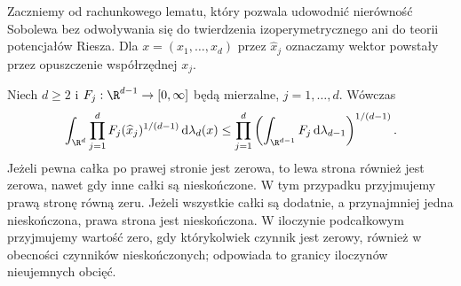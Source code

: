 Zaczniemy od rachunkowego lematu, który pozwala udowodnić
nierówność Sobolewa bez odwoływania się do twierdzenia
izoperymetrycznego ani do teorii potencjałów Riesza.
Dla $x=(x_1,\ldots,x_d)$ przez $\widehat x_j$ oznaczamy
wektor powstały przez opuszczenie współrzędnej $x_j$.

\begin{lemat}
\label{lem:pde10-LW}
Niech $d\ge2$ i $F_j:\R^{d-1}\to[0,\infty]$ będą mierzalne,
$j=1,\ldots,d$. Wówczas
\[
 \int_{\R^d}\prod_{j=1}^d F_j(\widehat x_j)^{1/(d-1)}
 \,\mathrm d\lambda_d(x)
 \le \prod_{j=1}^d
 \left(\int_{\R^{d-1}}F_j\,\mathrm d\lambda_{d-1}\right)^{1/(d-1)}.
\]
Jeżeli pewna całka po prawej stronie jest zerowa, to
lewa strona również jest zerowa, nawet gdy inne całki
są nieskończone. W tym przypadku przyjmujemy prawą
stronę równą zeru. Jeżeli wszystkie całki są dodatnie,
a przynajmniej jedna nieskończona, prawa strona jest
nieskończona. W iloczynie podcałkowym przyjmujemy wartość
zero, gdy którykolwiek czynnik jest zerowy, również
w obecności czynników nieskończonych; odpowiada to
granicy iloczynów nieujemnych obcięć.
\end{lemat}
